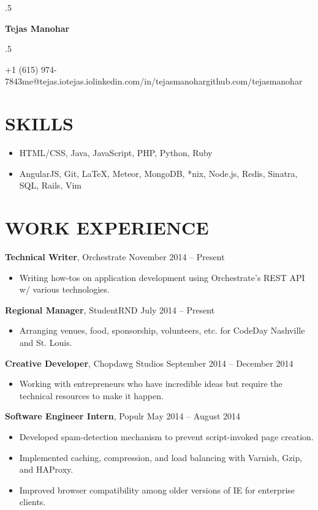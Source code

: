\documentclass{res}
\newcommand*{\its}{\hspace{0.8cm}}
\begin{document}
\moveleft.5\hoffset\centerline{\Huge\bf Tejas Manohar}
\bigskip
\moveleft.5\hoffset\centerline{+1 (615) 974-7843\its{}me@tejas.io\its{}\its{}tejas.io\its{}linkedin.com/in/tejasmanohar\its{}github.com/tejasmanohar}

\section{SKILLS}

\begin{itemize} \itemsep -2pt
  \item HTML/CSS, Java, JavaScript, PHP, Python, Ruby
  \item AngularJS, Git, \LaTeX, Meteor, MongoDB, *nix, Node.js, Redis, Sinatra, SQL, Rails, Vim
\end{itemize}

\section{WORK EXPERIENCE}

{\bf Technical Writer}, Orchestrate \hfill November 2014 -- Present
\begin{itemize} \itemsep -2pt
  \item Writing how-tos on application development using Orchestrate's REST API w/ various technologies.
\end{itemize}

{\bf Regional Manager}, StudentRND \hfill July 2014 -- Present
\begin{itemize} \itemsep -2pt
  \item Arranging venues, food, sponsorship, volunteers, etc. for CodeDay Nashville and St. Louis.
\end{itemize}

{\bf Creative Developer}, Chopdawg Studios \hfill September 2014 -- December 2014
\begin{itemize} \itemsep -2pt
  \item Working with entrepreneurs who have incredible ideas but require the technical resources to make it happen.
\end{itemize}

{\bf Software Engineer Intern}, Populr \hfill May 2014 -- August 2014
\begin{itemize} \itemsep -2pt
  \item Developed spam-detection mechanism to prevent script-invoked page creation.
  \item Implemented caching, compression, and load balancing with Varnish, Gzip, and HAProxy.
  \item Improved browser compatibility among older versions of IE for enterprise clients.
\end{itemize}
\end{document}

